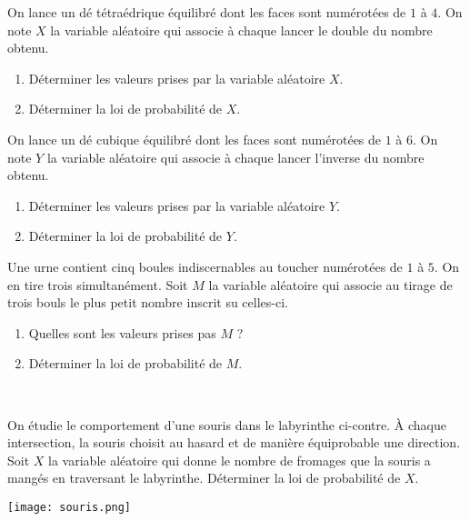 \documentclass[11pt]{article}
\begin{document}
\setcounter{exo}{0}
\vspace{2cm}

\begin{exo}
  On lance un dé tétraédrique équilibré dont les faces sont numérotées de $1$ à
  $4$. On note $X$ la variable aléatoire qui associe à chaque lancer le double
  du nombre obtenu.
  \begin{enumerate}
    \item Déterminer les valeurs prises par la variable aléatoire $X$.
    \item Déterminer la loi de probabilité de $X$.
  \end{enumerate}
\end{exo}

\begin{exo}
  On lance un dé cubique équilibré dont les faces sont numérotées de $1$ à
  $6$. On note $Y$ la variable aléatoire qui associe à chaque lancer l'inverse
  du nombre obtenu.
  \begin{enumerate}
    \item Déterminer les valeurs prises par la variable aléatoire $Y$.
    \item Déterminer la loi de probabilité de $Y$.
  \end{enumerate}
\end{exo}

\begin{exo}
  Une urne contient cinq boules indiscernables au toucher numérotées de $1$ à
  $5$. On en tire trois simultanément. Soit $M$ la variable aléatoire qui
  associe au tirage de trois bouls le plus petit nombre inscrit su celles-ci.
  \begin{enumerate}
    \item Quelles sont les valeurs prises pas $M$ ?
    \item Déterminer la loi de probabilité de $M$.
  \end{enumerate}
\end{exo}

\begin{exo}~\\
  \begin{minipage}[]{.5\textwidth}
    On étudie le comportement d'une souris dans le labyrinthe ci-contre. À
    chaque intersection, la souris choisit au hasard et de manière équiprobable
    une direction. Soit $X$ la variable aléatoire qui donne le nombre de
    fromages que la souris a mangés en traversant le labyrinthe. Déterminer la
    loi de probabilité de $X$.
  \end{minipage}
  \begin{minipage}[]{.5\textwidth}
    \begin{center}
      \texttt{[image: souris.png]}
    \end{center}
  \end{minipage}
\end{exo}
\end{document}
